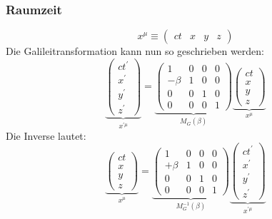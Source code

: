 \subsubsection{Raumzeit}
\begin{equation}
x^\mu \equiv 
\begin{pmatrix}
ct & x & y & z
\end{pmatrix}
\end{equation}
Die Galileitransformation kann nun so geschrieben werden:
\begin{equation}
\underbrace{
\begin{pmatrix}
ct^\prime \\
x^\prime \\
y^\prime \\
z^\prime
\end{pmatrix}
}_{x^{\prime \mu}}
= 
\underbrace{
\begin{pmatrix}
1 		& 0 & 0 & 0 \\
-\beta 	& 1 & 0 & 0 \\
0		& 0 & 1 & 0 \\
0		& 0 & 0 & 1
\end{pmatrix}
}_{M_G (\beta)}
\underbrace{
\begin{pmatrix}
ct \\
x \\
y \\
z
\end{pmatrix}
}_{x^\mu}
\end{equation}
Die Inverse lautet:
\begin{equation}
\underbrace{
\begin{pmatrix}
ct \\
x \\
y \\
z
\end{pmatrix}
}_{x^\mu}
= 
\underbrace{
\begin{pmatrix}
1 		& 0 & 0 & 0 \\
+\beta 	& 1 & 0 & 0 \\
0		& 0 & 1 & 0 \\
0		& 0 & 0 & 1
\end{pmatrix}
}_{M_G^{-1} (\beta)}
\underbrace{
\begin{pmatrix}
ct^\prime \\
x^\prime \\
y^\prime \\
z^\prime
\end{pmatrix}
}_{x^{\prime \mu}}
\end{equation}
